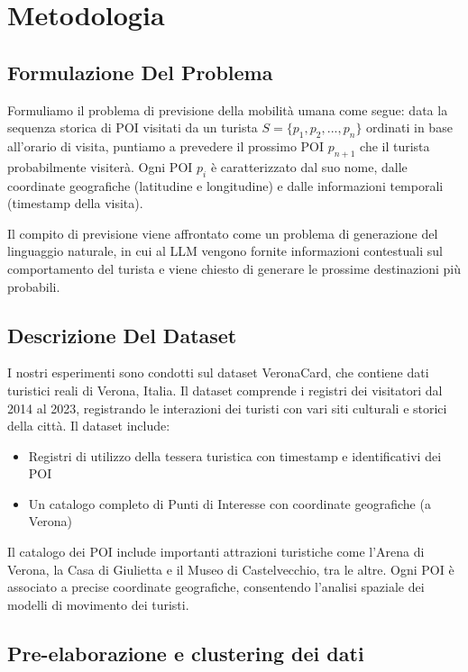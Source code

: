 \section{Metodologia}

\subsection{Formulazione Del Problema}

Formuliamo il problema di previsione della mobilità umana come segue: data la sequenza storica di POI visitati da un turista $S = \{p_1, p_2, ..., p_n\}$ ordinati in base all'orario di visita, puntiamo a prevedere il prossimo POI $p_{n+1}$ che il turista probabilmente visiterà. Ogni POI $p_i$ è caratterizzato dal suo nome, dalle coordinate geografiche (latitudine e longitudine) e dalle informazioni temporali (timestamp della visita).

Il compito di previsione viene affrontato come un problema di generazione del linguaggio naturale, in cui al LLM vengono fornite informazioni contestuali sul comportamento del turista e viene chiesto di generare le prossime destinazioni più probabili.


\subsection{Descrizione Del Dataset}

I nostri esperimenti sono condotti sul dataset VeronaCard, che contiene dati turistici reali di Verona, Italia. Il dataset comprende i registri dei visitatori dal 2014 al 2023, registrando le interazioni dei turisti con vari siti culturali e storici della città. Il dataset include:
\begin{itemize}
\item Registri di utilizzo della tessera turistica con timestamp e identificativi dei POI
\item Un catalogo completo di Punti di Interesse con coordinate geografiche (a Verona)
\end{itemize}

Il catalogo dei POI include importanti attrazioni turistiche come l'Arena di Verona, la Casa di Giulietta e il Museo di Castelvecchio, tra le altre. Ogni POI è associato a precise coordinate geografiche, consentendo l'analisi spaziale dei modelli di movimento dei turisti.

\subsection{Pre-elaborazione e clustering dei dati}

